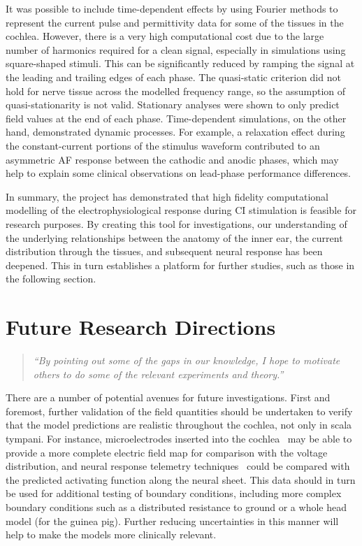 It was possible to include time-dependent effects by using Fourier methods to
represent the current pulse and permittivity data for some of the tissues in the
cochlea. However, there is a very high computational cost due to the large
number of harmonics required for a clean signal, especially in simulations using
square-shaped stimuli. This can be significantly reduced by ramping the signal
at the leading and trailing edges of each phase. The quasi-static criterion did
not hold for nerve tissue across the modelled frequency range, so the assumption
of quasi-stationarity is not valid. Stationary analyses were shown to only
predict field values at the end of each phase. Time-dependent simulations, on
the other hand, demonstrated dynamic processes. For example, a relaxation effect
during the constant-current portions of the stimulus waveform contributed to an
asymmetric AF response between the cathodic and anodic phases, which may help to
explain some clinical observations on lead-phase performance differences.

In summary, the project has demonstrated that high fidelity computational
modelling of the electrophysiological response during CI stimulation is feasible
for research purposes. By creating this tool for \insilico{} investigations, our
understanding of the underlying relationships between the anatomy of the inner
ear, the current distribution through the tissues, and subsequent neural
response has been deepened. This in turn establishes a platform for further
studies, such as those in the following section.

\section{Future Research Directions}

\begin{verse}
	\textit{
		``By pointing out some of the gaps in our knowledge, I hope to motivate others
		to do some of the relevant experiments and theory.''}

	\vspace{4mm}

\end{verse}

There are a number of potential avenues for future investigations. First and
foremost, further validation of the field quantities should be undertaken to
verify that the model predictions are realistic throughout the cochlea, not only
in scala tympani. For instance, microelectrodes inserted into the
cochlea~\cite{thorne2004} may be able to provide a more complete electric field
map for comparison with the \insilico{} voltage distribution, and neural
response telemetry techniques~\cite{abbas1999,cohen2003} could be compared with
the predicted activating function along the neural sheet. This data should in
turn be used for additional testing of boundary conditions, including more
complex boundary conditions such as a distributed resistance to ground or a
whole head model (for the guinea pig). Further reducing uncertainties in this
manner will help to make the models more clinically relevant.


